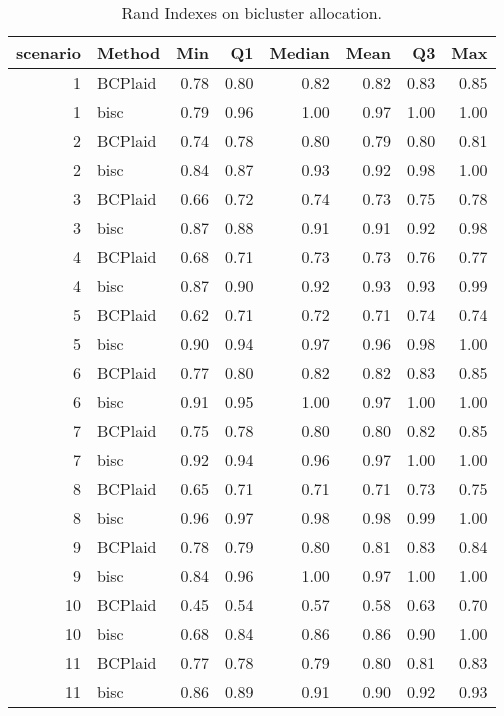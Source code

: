 \begin{table}[ht]
\caption{Rand Indexes on bicluster allocation.}
\vspace{1.5cm}
\centering
\begin{tabular}{rlrrrrrr}
  \toprule
scenario & Method & Min & Q1 & Median & Mean & Q3 & Max \\ 
  \midrule
  1 & BCPlaid & 0.78 & 0.80 & 0.82 & 0.82 & 0.83 & 0.85 \\ 
    1 & bisc & 0.79 & 0.96 & 1.00 & 0.97 & 1.00 & 1.00 \\ 
    2 & BCPlaid & 0.74 & 0.78 & 0.80 & 0.79 & 0.80 & 0.81 \\ 
    2 & bisc & 0.84 & 0.87 & 0.93 & 0.92 & 0.98 & 1.00 \\ 
    3 & BCPlaid & 0.66 & 0.72 & 0.74 & 0.73 & 0.75 & 0.78 \\ 
    3 & bisc & 0.87 & 0.88 & 0.91 & 0.91 & 0.92 & 0.98 \\ 
    4 & BCPlaid & 0.68 & 0.71 & 0.73 & 0.73 & 0.76 & 0.77 \\ 
    4 & bisc & 0.87 & 0.90 & 0.92 & 0.93 & 0.93 & 0.99 \\ 
    5 & BCPlaid & 0.62 & 0.71 & 0.72 & 0.71 & 0.74 & 0.74 \\ 
    5 & bisc & 0.90 & 0.94 & 0.97 & 0.96 & 0.98 & 1.00 \\ 
    6 & BCPlaid & 0.77 & 0.80 & 0.82 & 0.82 & 0.83 & 0.85 \\ 
    6 & bisc & 0.91 & 0.95 & 1.00 & 0.97 & 1.00 & 1.00 \\ 
    7 & BCPlaid & 0.75 & 0.78 & 0.80 & 0.80 & 0.82 & 0.85 \\ 
    7 & bisc & 0.92 & 0.94 & 0.96 & 0.97 & 1.00 & 1.00 \\ 
    8 & BCPlaid & 0.65 & 0.71 & 0.71 & 0.71 & 0.73 & 0.75 \\ 
    8 & bisc & 0.96 & 0.97 & 0.98 & 0.98 & 0.99 & 1.00 \\ 
    9 & BCPlaid & 0.78 & 0.79 & 0.80 & 0.81 & 0.83 & 0.84 \\ 
    9 & bisc & 0.84 & 0.96 & 1.00 & 0.97 & 1.00 & 1.00 \\ 
   10 & BCPlaid & 0.45 & 0.54 & 0.57 & 0.58 & 0.63 & 0.70 \\ 
   10 & bisc & 0.68 & 0.84 & 0.86 & 0.86 & 0.90 & 1.00 \\ 
   11 & BCPlaid & 0.77 & 0.78 & 0.79 & 0.80 & 0.81 & 0.83 \\ 
   11 & bisc & 0.86 & 0.89 & 0.91 & 0.90 & 0.92 & 0.93 \\ 

\end{tabular}
\end{table}
